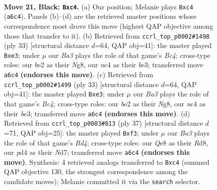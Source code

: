 \documentclass[11pt]{article}
\begin{document}
\clearpage

\begin{figure}[p]\centering
\begin{subfigure}{0.46\textwidth}\centering
\resizebox{\linewidth}{!}{%
\newchessgame
\chessboard[
  setfen={1r2q1k1/p1pp1ppp/b7/6n1/1pNP4/1P6/P1PQBP1P/1R4K1 b - - 5 21},
  showmover=false,
  pgfstyle=straightmove, color=movearrow, markmove={a6-c4}
]}
\caption{}
\end{subfigure}\hfill
\begin{subfigure}{0.46\textwidth}\centering
\resizebox{\linewidth}{!}{%
\newchessgame
\chessboard[
  setfen={2k3nr/1pp3pp/p3qp2/2b5/2N1P3/1P2B3/P3QPPP/R5K1 b - - 1 17},
  showmover=false,
  pgfstyle=straightmove, color=movearrow, markmove={c5-e3}
]}
\caption{}
\end{subfigure}
\\[4pt]
\begin{subfigure}{0.46\textwidth}\centering
\resizebox{\linewidth}{!}{%
\newchessgame
\chessboard[
  setfen={2k3nr/1pp3pp/p3qp2/2b5/2N1P3/1P2B3/P3QPPP/R5K1 b - - 1 17},
  showmover=false,
  pgfstyle=straightmove, color=movearrow, markmove={c5-e3}
]}
\caption{}
\end{subfigure}\hfill
\begin{subfigure}{0.46\textwidth}\centering
\resizebox{\linewidth}{!}{%
\newchessgame
\chessboard[
  setfen={3r2k1/p2nqpp1/1p2p2p/3b4/8/P3PN2/1PQ1BPPP/2R3K1 b - - 4 19},
  showmover=false,
  pgfstyle=straightmove, color=movearrow, markmove={d5-f3}
]}
\caption{}
\end{subfigure}
\caption{\textbf{Move 21, Black: \texttt{Bxc4}.} (a) Our position; Melanie plays \texttt{Bxc4} (\texttt{a6c4}). Panels (b)--(d) are the retrieved master positions whose correspondence most drove this move (highest QAP objective among those that transfer to it). (b) Retrieved from \texttt{ccrl\_top\_p0002\#1498} (ply 33) [structural distance $d$=64, QAP obj=41]: the master played \texttt{Bxe3}; under $\mu$ our \emph{Ba3} plays the role of that game's \emph{Bc4}; cross-type roles: our \emph{b}e2 as their \emph{N}g8, our \emph{n}c4 as their \emph{b}e3; transferred move \texttt{a6c4} \textbf{(endorses this move)}. (c) Retrieved from \texttt{ccrl\_top\_p0002\#1499} (ply 33) [structural distance $d$=64, QAP obj=41]: the master played \texttt{Bxe3}; under $\mu$ our \emph{Ba3} plays the role of that game's \emph{Bc4}; cross-type roles: our \emph{b}e2 as their \emph{N}g8, our \emph{n}c4 as their \emph{b}e3; transferred move \texttt{a6c4} \textbf{(endorses this move)}. (d) Retrieved from \texttt{ccrl\_top\_p0003\#813} (ply 37) [structural distance $d$=71, QAP obj=25]: the master played \texttt{Bxf3}; under $\mu$ our \emph{Ba3} plays the role of that game's \emph{Bd4}; cross-type roles: our \emph{Q}e8 as their \emph{R}d8, our \emph{p}d4 as their \emph{N}d7; transferred move \texttt{a6c4} \textbf{(endorses this move)}. Synthesis: 4 retrieved analogs transferred to \texttt{Bxc4} (summed QAP objective 130, the strongest correspondence among the candidate moves); Melanie committed it via the \texttt{search} selector.}
\label{fig:thought-m41}
\end{figure}
\end{document}
